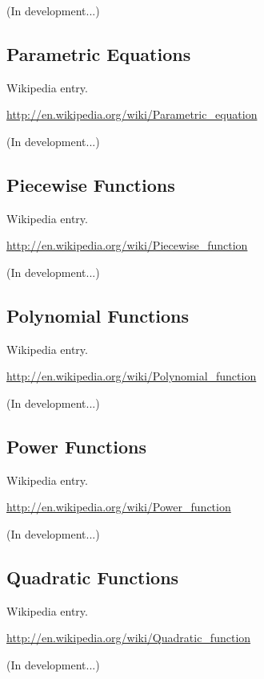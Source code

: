 \documentclass[12pt,oneside]{book}
\begin{document}
(In development...)

\subsection[Parametric Equations]{Parametric Equations}

Wikipedia entry.

\href{http://en.wikipedia.org/wiki/Parametric_equation}{http://en.wikipedia.org/wiki/Parametric\_equation}

(In development...)

\subsection[Piecewise Functions]{Piecewise Functions}

Wikipedia entry.

\href{http://en.wikipedia.org/wiki/Piecewise_function}{http://en.wikipedia.org/wiki/Piecewise\_function}

(In development...)

\subsection[Polynomial Functions]{Polynomial Functions}

Wikipedia entry.

\href{http://en.wikipedia.org/wiki/Polynomial_function}{http://en.wikipedia.org/wiki/Polynomial\_function}

(In development...)

\subsection[Power Functions]{Power Functions}

Wikipedia entry.

\href{http://en.wikipedia.org/wiki/Power_function}{http://en.wikipedia.org/wiki/Power\_function}

(In development...)

\subsection[Quadratic Functions]{Quadratic Functions}

Wikipedia entry.

\href{http://en.wikipedia.org/wiki/Quadratic_function}{http://en.wikipedia.org/wiki/Quadratic\_function}

(In development...)
\end{document}

